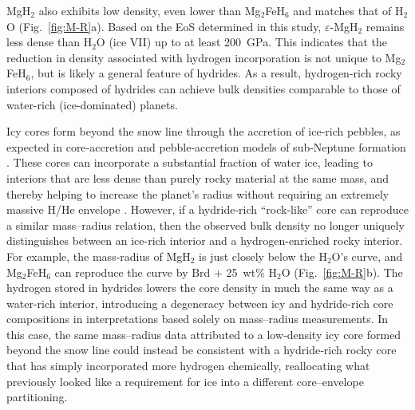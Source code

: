 \documentclass[draft,jgrga,12pt]{agujournal2019}
\begin{document}
MgH$_2$ also exhibits low density, even lower than Mg$_2$FeH$_6$ and matches that of H$_2$O (Fig.~\ref{fig:M-R}a). 
Based on the EoS determined in this study, $\varepsilon$-MgH$_2$ remains less dense than H$_2$O (ice VII) up to at least 200~GPa. 
This indicates that the reduction in density associated with hydrogen incorporation is not unique to Mg$_2$FeH$_6$, but is likely a general feature of hydrides. 
As a result, hydrogen-rich rocky interiors composed of hydrides can achieve bulk densities comparable to those of water-rich (ice-dominated) planets.

Icy cores form beyond the snow line through the accretion of ice‑rich pebbles, as expected in core‑accretion and pebble‑accretion models of sub‑Neptune formation \cite{bitsch_dry_2021, bean_nature_2021, burn_radius_2024, venturini_nature_2020}. 
These cores can incorporate a substantial fraction of water ice, leading to interiors that are less dense than purely rocky material at the same mass, and thereby helping to increase the planet's radius without requiring an extremely massive H/He envelope \cite{zeng_growth_2019}. 
However, if a hydride‑rich ``rock‑like'' core can reproduce a similar mass–radius relation, then the observed bulk density no longer uniquely distinguishes between an ice-rich interior and a hydrogen-enriched rocky interior. 
For example, the mass-radius of MgH$_2$ is just closely below the H$_2$O's curve, and Mg$_2$FeH$_6$ can reproduce the curve by Brd + 25~wt\% H$_2$O (Fig.~\ref{fig:M-R}b). 
The hydrogen stored in hydrides lowers the core density in much the same way as a water‑rich interior, introducing a degeneracy between icy and hydride-rich core compositions in interpretations based solely on mass--radius measurements.
In this case, the same mass–radius data attributed to a low‑density icy core formed beyond the snow line could instead be consistent with a hydride‑rich rocky core that has simply incorporated more hydrogen chemically, reallocating what previously looked like a requirement for ice into a different core–envelope partitioning.
\end{document}
